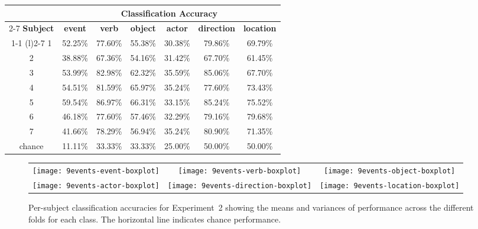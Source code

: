 \begin{table*}
  \caption{Per-subject mean classification accuracies
    averaged across fold for Experiment~2.
    Note that all six analyses perform above chance.}
  \label{tab:9events-results}
  \centering
  \begin{tabular}[b]{ccccccc}
    \toprule
    &\multicolumn{6}{c}{\textbf{Classification Accuracy}}\\
    \cmidrule(l){2-7}
    \textbf{Subject}
    &\textbf{event}&\textbf{verb}&\textbf{object}&\textbf{actor}&
    \textbf{direction}&\textbf{location}\\
    \cmidrule{1-1}
    \cmidrule(l){2-7}
    1&52.25\%&77.60\%&55.38\%&30.38\%&79.86\%&69.79\%\\
    2&38.88\%&67.36\%&54.16\%&31.42\%&67.70\%&61.45\%\\
    3&53.99\%&82.98\%&62.32\%&35.59\%&85.06\%&67.70\%\\
    4&54.51\%&81.59\%&65.97\%&35.24\%&77.60\%&73.43\%\\
    5&59.54\%&86.97\%&66.31\%&33.15\%&85.24\%&75.52\%\\
    6&46.18\%&77.60\%&57.46\%&32.29\%&79.16\%&79.68\%\\
    7&41.66\%&78.29\%&56.94\%&35.24\%&80.90\%&71.35\%\\[0.4ex]
    chance&11.11\%&33.33\%&33.33\%&25.00\%&50.00\%&50.00\%\\\bottomrule
  \end{tabular}
\end{table*}

\begin{landscape}
  \begin{figure}
    \centering
    \begin{tabular}{ccc}
      \texttt{[image: 9events-event-boxplot]}&
      \texttt{[image: 9events-verb-boxplot]}&
      \texttt{[image: 9events-object-boxplot]}\\
      \texttt{[image: 9events-actor-boxplot]}&
      \texttt{[image: 9events-direction-boxplot]}&
      \texttt{[image: 9events-location-boxplot]}\\
    \end{tabular}
    \caption{Per-subject classification accuracies for Experiment~2 showing
      the means and variances of performance across the different folds
      for each class.
      The horizontal line indicates chance performance.}
    \label{fig:9events-results2}
  \end{figure}
\end{landscape}

